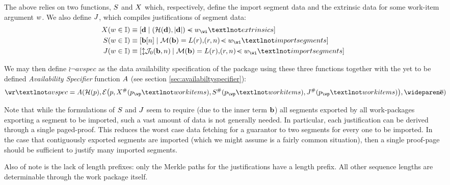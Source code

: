 The above relies on two functions, $S$ and $X$ which, respectively, define the import segment data and the extrinsic data for some work-item argument $w$. We also define $J$, which compiles justifications of segment data:
\begin{equation}
  \begin{aligned}
    \extrinsicdata(\wiX \in \workitem) &\equiv \sq{\build{\mathbf{d}}{(\blake(\mathbf{d}), \len{\mathbf{d}}) \orderedin \wiX_\wi¬extrinsics}} \\
    \importsegmentdata(\wiX \in \workitem) &\equiv \sq{\build{\segsX[n]}{\merklizecd(\segsX) = \segrootlookup(r), \tup{r, n} \orderedin \wiX_\wi¬importsegments}} \\
    \justifysegmentdata(\wiX \in \workitem) &\equiv \sq{\build{\var{\merklejustsubpath_0(\segsX, n)}}{\merklizecd(\segsX) = \segrootlookup(r), \tup{r, n} \orderedin \wiX_\wi¬importsegments}}
  \end{aligned}
\end{equation}

We may then define $\wr¬avspec$ as the data availability specification of the package using these three functions together with the yet to be defined \emph{Availability Specifier} function $A$ (see section \ref{sec:availabiltyspecifier}):
\begin{equation}
  \wr¬avspec = \newavailabilityspecifier(
    \blake(\wpX),
    \encode{
      \wpX,
      \extrinsicdata^\#(\wpX_\wp¬workitems),
      \importsegmentdata^\#(\wpX_\wp¬workitems),
      \justifysegmentdata^\#(\wpX_\wp¬workitems)
    },
    \concatall{\allexports}
  )\!\!\!\!
\end{equation}

Note that while the formulations of $S$ and $J$ seem to require (due to the inner term $\mathbf{b}$) all segments exported by all work-packages exporting a segment to be imported, such a vast amount of data is not generally needed. In particular, each justification can be derived through a single paged-proof. This reduces the worst case data fetching for a guarantor to two segments for every one to be imported. In the case that contiguously exported segments are imported (which we might assume is a fairly common situation), then a single proof-page should be sufficient to justify many imported segments.

Also of note is the lack of length prefixes: only the Merkle paths for the justifications have a length prefix. All other sequence lengths are determinable through the work package itself.

